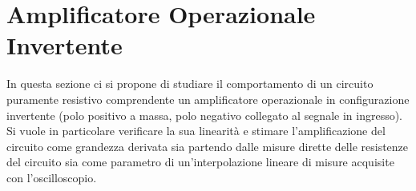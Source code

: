 \documentclass[a4paper,11pt]{article} %
\begin{document}
%			
%			
%			
%			
%
%
%		
%
%			
%			
%
%			
%			
%
%	



\section{Amplificatore Operazionale Invertente}\label{s:opamp} In questa sezione ci si propone di studiare il
comportamento di un circuito puramente resistivo comprendente un amplificatore operazionale in configurazione invertente
(polo positivo a massa, polo negativo collegato al segnale in ingresso). Si vuole in particolare verificare la sua
linearità e stimare l'amplificazione del circuito come grandezza derivata sia partendo dalle misure dirette delle
resistenze del circuito sia come parametro di un'interpolazione lineare di misure acquisite con l'oscilloscopio. 
\end{document}
